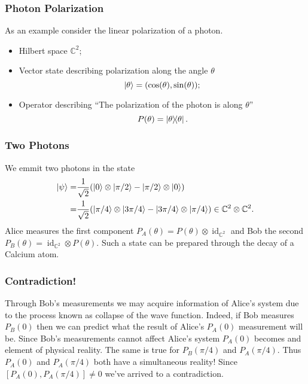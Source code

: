 \documentclass{beamer}
\DeclareMathOperator{\id}{id}
\begin{document}
\begin{frame}

	\frametitle{Photon Polarization}

	As an example consider the linear polarization of a photon.
	
	\begin{itemize}
	
		\item Hilbert space $\mathbb{C}^2$;
		\item Vector state describing polarization along the angle $\theta$ 
		\begin{equation}
			\ket{\theta}=(\cos(\theta),\sin(\theta));
		\end{equation}
		\item Operator describing ``The polarization of the photon is along $\theta$''
		\begin{equation}
			P(\theta)=\dyad{\theta}.
		\end{equation}
	
	\end{itemize}

\end{frame}

\begin{frame}

	\frametitle{Two Photons}
	
	We emmit two photons in the state
	\begin{align}
	\begin{split}
		\ket{\psi}=&\frac{1}{\sqrt{2}}(\ket{0}\otimes\ket{\pi/2}-\ket{\pi/2}\otimes\ket{0})\\
		=&\frac{1}{\sqrt{2}}(\ket{\pi/4}\otimes\ket{3\pi/4}-\ket{3\pi/4}\otimes\ket{\pi/4})\in\mathbb{C}^2\otimes\mathbb{C}^2.
	\end{split}
	\end{align}
	Alice measures the first component $P_A(\theta)=P(\theta)\otimes\id_{\mathbb{C}^2}$ and Bob the second $P_B(\theta)=\id_{\mathbb{C}^2}\otimes P(\theta)$. Such a state can be prepared through the decay of a Calcium atom\cite{Reyes2013}.

\end{frame}

\begin{frame}

	\frametitle{Contradiction!}
	
	Through Bob's measurements we may acquire information of Alice's system due to the process known as collapse of the wave function. Indeed, if Bob measures $P_B(0)$ then we can predict what the result of Alice's $P_A(0)$ measurement will be. Since Bob's measurements cannot affect Alice's system $P_A(0)$ becomes and element of physical reality. The same is true for $P_B(\pi/4)$ and $P_A(\pi/4)$. Thus $P_A(0)$ and $P_A(\pi/4)$ both have a simultaneous reality! Since $[P_A(0),P_A(\pi/4)]\neq 0$ we've arrived to a contradiction. 

\end{frame}
\end{document}
